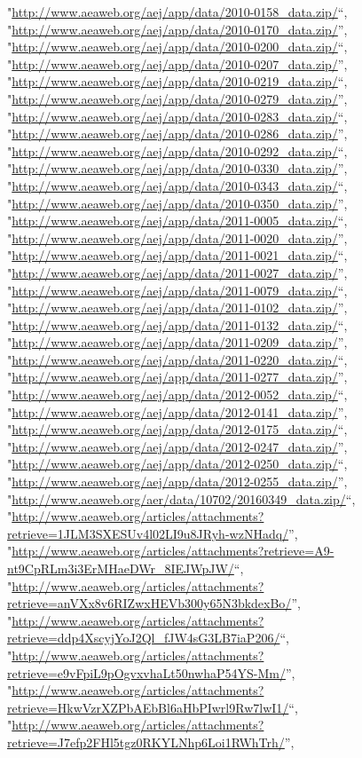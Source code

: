 \documentclass[]{article}
\begin{document}
\begin{itemize}
  "\url{http://www.aeaweb.org/aej/app/data/2010-0158_data.zip/}``,
  "\url{http://www.aeaweb.org/aej/app/data/2010-0170_data.zip/}'',
  "\url{http://www.aeaweb.org/aej/app/data/2010-0200_data.zip/}``,
  "\url{http://www.aeaweb.org/aej/app/data/2010-0207_data.zip/}'',
  "\url{http://www.aeaweb.org/aej/app/data/2010-0219_data.zip/}``,
  "\url{http://www.aeaweb.org/aej/app/data/2010-0279_data.zip/}'',
  "\url{http://www.aeaweb.org/aej/app/data/2010-0283_data.zip/}``,
  "\url{http://www.aeaweb.org/aej/app/data/2010-0286_data.zip/}'',
  "\url{http://www.aeaweb.org/aej/app/data/2010-0292_data.zip/}``,
  "\url{http://www.aeaweb.org/aej/app/data/2010-0330_data.zip/}'',
  "\url{http://www.aeaweb.org/aej/app/data/2010-0343_data.zip/}``,
  "\url{http://www.aeaweb.org/aej/app/data/2010-0350_data.zip/}'',
  "\url{http://www.aeaweb.org/aej/app/data/2011-0005_data.zip/}``,
  "\url{http://www.aeaweb.org/aej/app/data/2011-0020_data.zip/}'',
  "\url{http://www.aeaweb.org/aej/app/data/2011-0021_data.zip/}``,
  "\url{http://www.aeaweb.org/aej/app/data/2011-0027_data.zip/}'',
  "\url{http://www.aeaweb.org/aej/app/data/2011-0079_data.zip/}``,
  "\url{http://www.aeaweb.org/aej/app/data/2011-0102_data.zip/}'',
  "\url{http://www.aeaweb.org/aej/app/data/2011-0132_data.zip/}``,
  "\url{http://www.aeaweb.org/aej/app/data/2011-0209_data.zip/}'',
  "\url{http://www.aeaweb.org/aej/app/data/2011-0220_data.zip/}``,
  "\url{http://www.aeaweb.org/aej/app/data/2011-0277_data.zip/}'',
  "\url{http://www.aeaweb.org/aej/app/data/2012-0052_data.zip/}``,
  "\url{http://www.aeaweb.org/aej/app/data/2012-0141_data.zip/}'',
  "\url{http://www.aeaweb.org/aej/app/data/2012-0175_data.zip/}``,
  "\url{http://www.aeaweb.org/aej/app/data/2012-0247_data.zip/}'',
  "\url{http://www.aeaweb.org/aej/app/data/2012-0250_data.zip/}``,
  "\url{http://www.aeaweb.org/aej/app/data/2012-0255_data.zip/}'',
  "\url{http://www.aeaweb.org/aer/data/10702/20160349_data.zip/}``,
  "\url{http://www.aeaweb.org/articles/attachments?retrieve=1JLM3SXESUv4l02LI9u8JRyh-wzNHadq/}'',
  "\url{http://www.aeaweb.org/articles/attachments?retrieve=A9-nt9CpRLm3i3ErMHaeDWr_8IEJWpJW/}``,
  "\url{http://www.aeaweb.org/articles/attachments?retrieve=anVXx8v6RIZwxHEVb300y65N3bkdexBo/}'',
  "\url{http://www.aeaweb.org/articles/attachments?retrieve=ddp4XscyjYoJ2Ql_fJW4sG3LB7iaP206/}``,
  "\url{http://www.aeaweb.org/articles/attachments?retrieve=e9vFpiL9pOgvxvhaLt50nwhaP54YS-Mm/}'',
  "\url{http://www.aeaweb.org/articles/attachments?retrieve=HkwVzrXZPbAEbBl6aHbPIwrl9Rw7lwI1/}``,
  "\url{http://www.aeaweb.org/articles/attachments?retrieve=J7efp2FHl5tgz0RKYLNhp6Loi1RWhTrh/}'',

\end{itemize}
\end{document}
